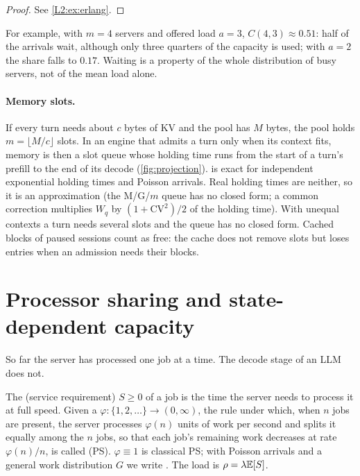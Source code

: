 \begin{proof}See \cref{L2:ex:erlang}.\end{proof}

For example, with $m=4$ servers and offered load $a=3$, $C(4,3)\approx0.51$: half of the
arrivals wait, although only three quarters of the capacity is used; with $a=2$ the
share falls to $0.17$. Waiting is a property of the whole distribution of busy
servers, not of the mean load alone.

\paragraph{Memory slots.} If every turn needs about $c$ bytes of KV and the pool has
$M$ bytes, the pool holds $m=\lfloor M/c\rfloor$ slots. In an engine that admits a turn
only when its context fits, memory is then a slot queue whose holding time runs from
the start of a turn's prefill to the end of its decode (\cref{fig:projection}).
 is exact for independent exponential holding times and Poisson
arrivals. Real holding times are neither, so it is an approximation (the M/G/$m$ queue
has no closed form; a common correction multiplies $W_q$ by $(1+\mathrm{CV}^2)/2$ of the
holding time). With unequal contexts a turn needs several slots and the queue has no
closed form. Cached blocks of paused sessions count as free: the cache does not remove
slots but loses entries when an admission needs their blocks.

\section{Processor sharing and state-dependent capacity}

So far the server has processed one job at a time. The decode stage of an LLM does not.

\begin{definition}\label{def:ps}
The  (service requirement) $S\ge0$ of a job is the time the server needs to
process it at full speed.
Given a  $\varphi:\{1,2,\dots\}\to(0,\infty)$, the rule under
which, when $n$ jobs are present, the server processes $\varphi(n)$ units of work per
second and splits it equally among the $n$ jobs, so that each job's remaining work
decreases at rate $\varphi(n)/n$, is called  (PS).
$\varphi\equiv1$ is classical PS; with Poisson arrivals and a general work distribution
$G$ we write . The load is $\rho=\lambda\mathbb{E}[S]$.
\end{definition}

